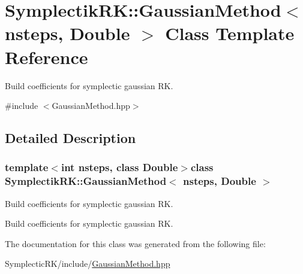 \hypertarget{classSymplectikRK_1_1GaussianMethod}{\section{Symplectik\-R\-K\-:\-:Gaussian\-Method$<$ nsteps, Double $>$ Class Template Reference}
\label{classSymplectikRK_1_1GaussianMethod}
}


Build coefficients for symplectic gaussian R\-K.  




{\ttfamily \#include $<$Gaussian\-Method.\-hpp$>$}



\subsection{Detailed Description}
\subsubsection*{template$<$int nsteps, class Double$>$class Symplectik\-R\-K\-::\-Gaussian\-Method$<$ nsteps, Double $>$}

Build coefficients for symplectic gaussian R\-K. 

Build coefficients for symplectic gaussian R\-K. 

The documentation for this class was generated from the following file\-:\begin{DoxyCompactItemize}
\item 
Symplectic\-R\-K/include/\hyperlink{GaussianMethod_8hpp}{Gaussian\-Method.\-hpp}\end{DoxyCompactItemize}
